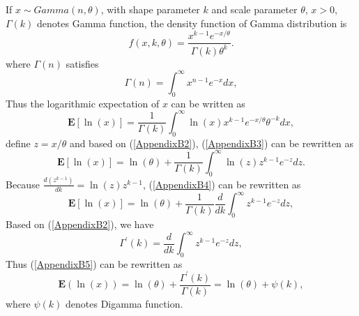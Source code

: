 \documentclass[12pt, draftclsnofoot, onecolumn]{IEEEtran}
\begin{document}
\section{}\label{proof log expectation gamma}
If $x\sim Gamma(n, \theta)$, with shape parameter $k$ and scale parameter $\theta$, $x>0$, $\Gamma(k)$ denotes Gamma function, the density function of Gamma distribution is
\begin{equation}
f(x,k,\theta)=\frac{x^{k-1}e^{-x/\theta}}{\Gamma(k)\theta^{k}}.
\label{AppendixB1}
\end{equation}
where $\Gamma(n)$ satisfies\cite{papoulis2002probability}
\begin{equation}
\Gamma(n)=\int_{0}^{\infty}x^{n-1}e^{-x}dx,
\label{AppendixB2}
\end{equation}
Thus the logarithmic expectation of $x$ can be written as
\begin{equation}
\mathbf{E}[\ln(x)]=\frac{1}{\Gamma(k)}\int_{0}^{\infty}\ln(x)x^{k-1}e^{-x/\theta}\theta^{-k}dx,
\label{AppendixB3}
\end{equation}
define $z=x/\theta$ and based on (\ref{AppendixB2}), (\ref{AppendixB3}) can be rewritten as
\begin{equation}
\mathbf{E}[\ln(x)]=\ln(\theta)+\frac{1}{\Gamma(k)}\int_{0}^{\infty}\ln(z)z^{k-1}e^{-z}dz.
\label{AppendixB4}
\end{equation}
Because $\frac{d(z^{k-1})}{dk}=\ln(z)z^{k-1}$, (\ref{AppendixB4}) can be rewritten as
\begin{equation}
\mathbf{E}[\ln(x)]=\ln(\theta)+\frac{1}{\Gamma(k)}\frac{d}{dk}\int_{0}^{\infty}z^{k-1}e^{-z}dz,
\label{AppendixB5}
\end{equation}
Based on (\ref{AppendixB2}), we have
\begin{equation}
\Gamma^{'}(k)=\frac{d}{dk}\int_{0}^{\infty}z^{k-1}e^{-z}dz,
\label{AppendixB6}
\end{equation}
Thus (\ref{AppendixB5}) can be rewritten as
\begin{equation}
\mathbf{E}(\ln(x))=\ln(\theta)+\frac{\Gamma^{'}(k)}{\Gamma(k)}=\ln(\theta)+\psi(k),
\label{AppendixB6}
\end{equation}
where $\psi(k)$ denotes Digamma function.
\end{document}
